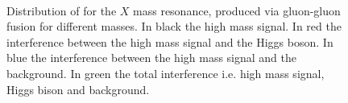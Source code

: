 \begin{figure}[htbp]
\centering
{}
\\
\caption{Distribution of for the $X$ mass resonance, produced via gluon-gluon fusion for different masses. In black the high mass signal. In red the interference between the high mass signal and the Higgs boson. In blue the interference between the high mass signal and the background. In green the total interference i.e. high 
mass signal, Higgs bison and background. }
    \label{fig:X300}
\end{figure}





